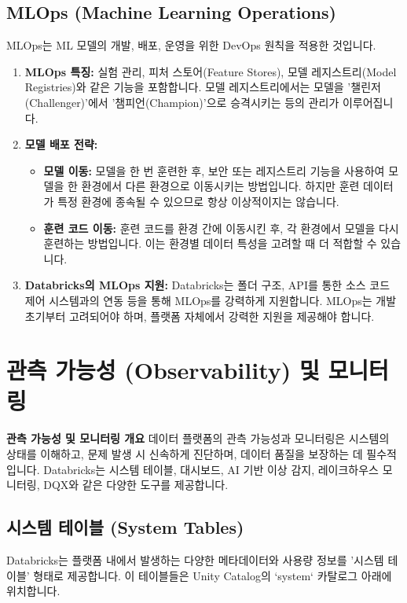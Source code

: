 \documentclass[11pt,a4paper]{article}
\begin{document}
\subsection{MLOps (Machine Learning Operations)}
MLOps는 ML 모델의 개발, 배포, 운영을 위한 DevOps 원칙을 적용한 것입니다.

\begin{enumerate}
    \item \textbf{MLOps 특징:}
    실험 관리, 피처 스토어(Feature Stores), 모델 레지스트리(Model Registries)와 같은 기능을 포함합니다. 모델 레지스트리에서는 모델을 '챌린저(Challenger)'에서 '챔피언(Champion)'으로 승격시키는 등의 관리가 이루어집니다.

    \item \textbf{모델 배포 전략:}
    \begin{itemize}
        \item \textbf{모델 이동:} 모델을 한 번 훈련한 후, 보안 또는 레지스트리 기능을 사용하여 모델을 한 환경에서 다른 환경으로 이동시키는 방법입니다. 하지만 훈련 데이터가 특정 환경에 종속될 수 있으므로 항상 이상적이지는 않습니다.
        \item \textbf{훈련 코드 이동:} 훈련 코드를 환경 간에 이동시킨 후, 각 환경에서 모델을 다시 훈련하는 방법입니다. 이는 환경별 데이터 특성을 고려할 때 더 적합할 수 있습니다.
    \end{itemize}

    \item \textbf{Databricks의 MLOps 지원:}
    Databricks는 폴더 구조, API를 통한 소스 코드 제어 시스템과의 연동 등을 통해 MLOps를 강력하게 지원합니다. MLOps는 개발 초기부터 고려되어야 하며, 플랫폼 자체에서 강력한 지원을 제공해야 합니다.
\end{enumerate}

\newpage
\section{관측 가능성 (Observability) 및 모니터링}

\begin{conceptbox}
\textbf{관측 가능성 및 모니터링 개요}
데이터 플랫폼의 관측 가능성과 모니터링은 시스템의 상태를 이해하고, 문제 발생 시 신속하게 진단하며, 데이터 품질을 보장하는 데 필수적입니다. Databricks는 시스템 테이블, 대시보드, AI 기반 이상 감지, 레이크하우스 모니터링, DQX와 같은 다양한 도구를 제공합니다.
\end{conceptbox}

\subsection{시스템 테이블 (System Tables)}
Databricks는 플랫폼 내에서 발생하는 다양한 메타데이터와 사용량 정보를 '시스템 테이블' 형태로 제공합니다. 이 테이블들은 Unity Catalog의 `system` 카탈로그 아래에 위치합니다.
\end{document}
